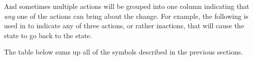 
And sometimes multiple actions will be grouped into one column indicating
that \textit{any} one of the actions can bring about the change.  For example,
the following is used in  to indicate any of three actions, or rather
inactions, that will cause the  state to go back to the 
state.


\pagebreak

The table below sums up all of the symbols described in the previous sections.


